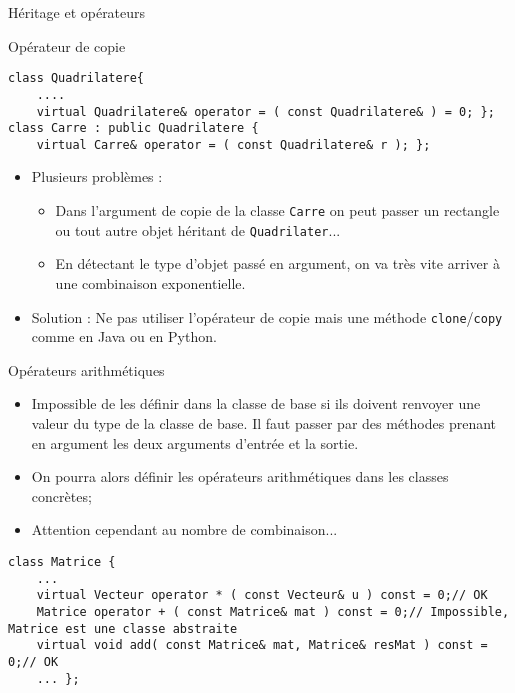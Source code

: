 \documentclass[handout,10pt]{beamer}
\begin{document}
\begin{frame}[fragile]{Héritage et opérateurs}
\tiny
\begin{block}{Opérateur de copie}
\begin{lstlisting}
class Quadrilatere{
    ....
    virtual Quadrilatere& operator = ( const Quadrilatere& ) = 0; };
class Carre : public Quadrilatere {
    virtual Carre& operator = ( const Quadrilatere& r ); };
\end{lstlisting}
\begin{itemize}
\item \alert{Plusieurs problèmes} :
\begin{itemize}
\item Dans l'argument de copie de la classe \lstinline$Carre$ on peut passer un rectangle ou tout autre objet héritant de \lstinline$Quadrilater$...
\item En détectant le type d'objet passé en argument, on va très vite arriver à une combinaison exponentielle.
\end{itemize}
\item {\color{blue}Solution} : Ne pas utiliser l'opérateur de copie mais une méthode \lstinline{clone}/\lstinline{copy} comme en Java ou en Python.
\end{itemize}
\end{block}

\begin{block}{Opérateurs arithmétiques}
\begin{itemize}
\item Impossible de les définir dans la classe de base si ils doivent renvoyer une valeur du type de la classe de base. Il faut passer par des méthodes prenant en argument les deux arguments d'entrée et la sortie.
\item On pourra alors définir les opérateurs arithmétiques dans les classes concrètes;
\item Attention cependant au nombre de combinaison...
\end{itemize}
\begin{lstlisting}
class Matrice {
    ...
    virtual Vecteur operator * ( const Vecteur& u ) const = 0;// OK
    Matrice operator + ( const Matrice& mat ) const = 0;// Impossible, Matrice est une classe abstraite
    virtual void add( const Matrice& mat, Matrice& resMat ) const = 0;// OK
    ... };
\end{lstlisting}
\end{block}
\end{frame}
\end{document}
